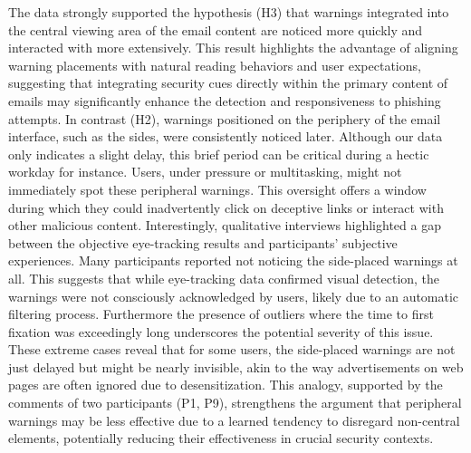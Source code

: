 \documentclass[
  a4paper,  %
  twoside,  %
  bibliography=totoc,
  headsepline,
  cleardoublepage=empty,
  parskip=half,
  draft=false
]{scrbook}
\begin{document}
The data strongly supported the hypothesis (H3) that warnings integrated into the central viewing area of the email content are noticed more quickly and interacted with more extensively. This result highlights the advantage of aligning warning placements with natural reading behaviors and user expectations, suggesting that integrating security cues directly within the primary content of emails may significantly enhance the detection and responsiveness to phishing attempts. \newline
In contrast (H2), warnings positioned on the periphery of the email interface, such as the sides, were consistently noticed later. Although our data only indicates a slight delay, this brief period can be critical during a hectic workday for instance. Users, under pressure or multitasking, might not immediately spot these peripheral warnings. This oversight offers a window during which they could inadvertently click on deceptive links or interact with other malicious content. \newline
Interestingly, qualitative interviews highlighted a gap between the objective eye-tracking results and participants' subjective experiences. Many participants reported not noticing the side-placed warnings at all. This suggests that while eye-tracking data confirmed visual detection, the warnings were not consciously acknowledged by users, likely due to an automatic filtering process.\newline
Furthermore the presence of outliers where the time to first fixation was exceedingly long underscores the potential severity of this issue. These extreme cases reveal that for some users, the side-placed warnings are not just delayed but might be nearly invisible, akin to the way advertisements on web pages are often ignored due to desensitization. This analogy, supported by the comments of two participants (P1, P9), strengthens the argument that peripheral warnings may be less effective due to a learned tendency to disregard non-central elements, potentially reducing their effectiveness in crucial security contexts.

\end{document}

